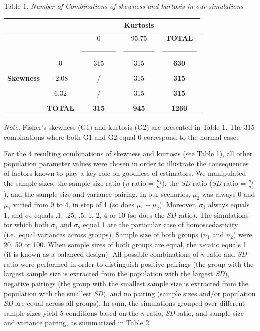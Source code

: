 \documentclass[
  man]{apa6}
\begin{document}
Table 1.
\emph{Number of Combinations of skewness and kurtosis in our simulations}

\begin{longtable}[]{@{}ccccc@{}}
\toprule
& & & \textbf{Kurtosis} &\tabularnewline
\midrule
\endhead
& & 0 & 95.75 & \textbf{TOTAL}\tabularnewline
& & --------------- & -------------- & ---------------\tabularnewline
& 0 & 315 & 315 & \textbf{630}\tabularnewline
& & & &\tabularnewline
\textbf{Skewness} & -2.08 & / & 315 & \textbf{315}\tabularnewline
& & & &\tabularnewline
& 6.32 & / & 315 & \textbf{315}\tabularnewline
& & & &\tabularnewline
& \textbf{TOTAL} & \textbf{315} & \textbf{945} & \textbf{1260}\tabularnewline
\bottomrule
\end{longtable}

\emph{Note.} Fisher's skewness (G1) and kurtosis (G2) are presented in Table 1. The 315 combinations where both G1 and G2 equal 0 correspond to the normal case.

For the 4 resulting combinations of skewness and kurtosis (see Table 1), all other population parameter values were chosen in order to illustrate the consequences of factors known to play a key role on goodness of estimators. We manipulated the sample sizes, the sample size ratio (\emph{n}-ratio = \(\frac{n_1}{n_2}\)), the \emph{SD}-ratio (\emph{SD}-ratio = \(\frac{\sigma_1}{\sigma_2}\)), and the sample size and variance pairing. In our scenarios, \(\mu_2\) was always 0 and \(\mu_1\) varied from 0 to 4, in step of 1 (so does \(\mu_1-\mu_2\)). Moreover, \(\sigma_1\) always equals 1, and \(\sigma_2\) equals .1, .25, .5, 1, 2, 4 or 10 (so does the \emph{SD}-ratio). The simulations for which both \(\sigma_1\) and \(\sigma_2\) equal 1 are the particular case of homoscedasticity (i.e.~equal variances across groups). Sample size of both groups (\(n_1\) and \(n_2\)) were 20, 50 or 100. When sample sizes of both groups are equal, the \emph{n}-ratio equals 1 (it is known as a balanced design). All possible combinations of \emph{n}-ratio and \emph{SD}-ratio were performed in order to distinguish positive pairings (the group with the largest sample size is extracted from the population with the largest \emph{SD}), negative pairings (the group with the smallest sample size is extracted from the population with the smallest \emph{SD}), and no pairing (sample sizes and/or population \emph{SD} are equal across all groups). In sum, the simulations grouped over different sample sizes yield 5 conditions based on the \emph{n}-ratio, \emph{SD}-ratio, and sample size and variance pairing, as summarized in Table 2.
\end{document}

